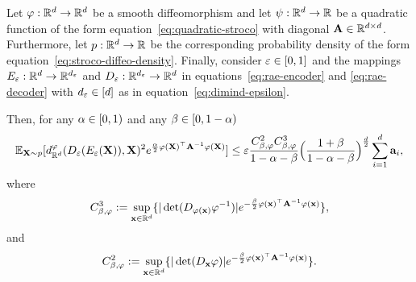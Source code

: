 \begin{lemma}
    \label{lem:rae-bound-phi-metric}
        Let $\varphi:\mathbb{R}^d \to \mathbb{R}^d$ be a smooth diffeomorphism and let $\psi: \mathbb{R}^d \to \mathbb{R}$ be a quadratic function of the form equation~\ref{eq:quadratic-stroco} with diagonal $\mathbf{A} \in \mathbb{R}^{d\times d}$. Furthermore, let $p:\mathbb{R}^d \to\mathbb{R}$ be the corresponding probability density of the form equation~\ref{eq:stroco-diffeo-density}. Finally, consider $\varepsilon\in [0,1]$ and the mappings $E_\varepsilon:\mathbb{R}^d \to \mathbb{R}^{d_\varepsilon}$ and $D_\varepsilon:\mathbb{R}^{d_\varepsilon} \to \mathbb{R}^d$ in equations~\ref{eq:rae-encoder} and \ref{eq:rae-decoder} with $d_\varepsilon \in [d]$ as in equation~\ref{eq:dimind-epsilon}.
    
        Then, for any $\alpha \in [0,1)$ and any $\beta\in [0,1- \alpha)$
        \begin{equation}
        \mathbb{E}_{\mathbf{X} \sim p}[d_{\mathbb{R}^{d}}^\varphi (D_\varepsilon(E_\varepsilon(\mathbf{X})), \mathbf{X})^2 e^{\frac{\alpha}{2} \varphi(\mathbf{X})^\top \mathbf{A}^{-1} \varphi(\mathbf{X})}] \leq \varepsilon \frac{C^2_{\beta,\varphi} C^3_{\beta,\varphi}}{1 - \alpha - \beta} \Bigl(\frac{1 + \beta}{1 - \alpha - \beta} \Bigr)^{\frac{d}{2}} \sum_{i=1}^{d} \mathbf{a}_{i},
        \label{eq:lem-rae-bound}
\end{equation}
where
\begin{equation}
    C^3_{\beta,\varphi} := \sup_{\mathbf{x}\in \mathbb{R}^{d}} \{ |\det (D_{\varphi(\mathbf{x})} \varphi^{-1})| e^{-\frac{\beta}{2} \varphi(\mathbf{x})^\top \mathbf{A}^{-1} \varphi(\mathbf{x}) } \},
    \label{eq:RAEinvdiffeoRegConstant}
\end{equation}
and
\begin{equation}
    C^2_{\beta,\varphi} := \sup_{\mathbf{x}\in \mathbb{R}^{d}} \{ |\det (D_{\mathbf{x}} \varphi)| e^{-\frac{\beta}{2} \varphi(\mathbf{x})^\top \mathbf{A}^{-1} \varphi(\mathbf{x}) } \}.
    \label{eq:RAEdiffeoRegConstant}
\end{equation}
\end{lemma}

